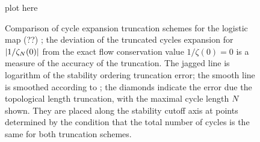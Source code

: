 \begin{figure}
\begin{center}
plot here %
\end{center}
\caption{
    {\small
Comparison of cycle expansion truncation schemes for the
logistic map (??)%
;
the deviation of the truncated cycles
expansion for $|1/\zeta_N(0)|$ from the exact
flow conservation value $1/\zeta(0)=0$ is a measure of the accuracy of the
truncation.  The jagged
line is logarithm of the stability ordering
truncation error; the smooth line is smoothed according to
; the diamonds indicate the error
due the topological length truncation, with
the maximal cycle length $N$ shown.
They are placed along the stability cutoff axis at points determined
by the condition that the total number of cycles is the same for both
truncation schemes.
        }}
\label{fig:logStabOrder}
\end{figure}
